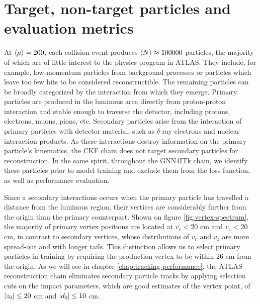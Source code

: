 \section{Target, non-target particles and evaluation metrics}
\label{sect:eval-metrics}
At $\expval{\mu}=200$, each collision event produces $\expval{N}\approx 100000$ particles, the majority of which are of little interest to the physics program in ATLAS. 
They include, for example, low-momentum particles from background processes or particles which leave too few hits to be considered reconstructible.
The remaining particles can be broadly categorized by the interaction from which they emerge. 
Primary particles are produced in the luminous area directly from proton-proton interaction and stable enough to traverse the detector, including protons, electrons, muons, pions, etc.
Secondary particles arise from the interaction of primary particles with detector material, such as $\delta$-ray electrons and nuclear interaction products. 
As these interactions destroy information on the primary particle's kinematics, the CKF chain does not target secondary particles for reconstruction.
In the same spirit, throughout the GNN4ITk chain, we identify these particles prior to model training and exclude them from the loss function, as well as performance evaluation.

Since a secondary interactions occurs when the primary particle has travelled a distance from the luminous region, their vertices are considerably further from the origin than the primary counterpart. 
Shown on figure \ref{fig:vertex-spectrum}, the majority of primary vertex positions are located at $v_r < 20$ cm and $v_z < 20$ cm, in contrast to secondary vertices, whose distributions of $v_r$ and $v_z$ are more spread-out and with longer tails.
This distinction allows us to select primary particles in training by requiring the production vertex to be within 26 cm from the origin.
As we will see in chapter \ref{chap:tracking-performance}, the ATLAS reconstruction chain eliminates secondary particle tracks by applying selection cuts on the impact parameters, which are good estimates of the vertex point, of $\abs{z_0}\le 20$ cm and $\abs{d_0}\le10$ cm. 


